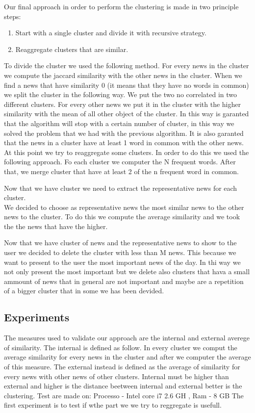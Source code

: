 \documentclass{acm_proc_article-sp}
\begin{document}
Our final approach in order to perform the clustering is made in two principle steps:
\begin{enumerate}
\item Start with a single cluster and divide it with recursive strategy.
\item Reaggregate clusters that are similar.
\end{enumerate}
To divide the cluster we used the following method. For every news in the cluster we compute the jaccard similarity with the other news in the cluster. When we find a news that have similarity 0 (it means that they have no words in common) we split the cluster in the following way. We put the two no correlated in two different clusters. For every other news we put it in the cluster with the higher similarity with the mean of all other object of the cluster. In this way is garanted that the algorithm will stop with a certain number of cluster, in this way we solved the problem that we had with the previous algorithm. It is also garanted that the news in a cluster have at least 1 word in common with the other news.\\
At this point we try to reaggregate some clusters. In order to do this we used the following approach. Fo each cluster we computer the N frequent words. After that, we merge cluster that have at least 2 of the n frequent word in common.

Now that we have cluster we need to extract the representative news for each cluster.\\
We decided to choose as representative news the most similar news to the other news to the cluster. To do this we compute the average similarity and we took the the news that have the higher.

Now that we have cluster of news and the representative news to show to the user we decided to delete the cluster with less than M news. This because we want to present to the user the most important news of the day. In thi way we not only present the most important but we delete also clusters that hava a small ammount of news that in general are not important and maybe are a repetition of a bigger cluster that in some we has been devided.

\subsection{Experiments}
The measures used to validate our approach are the internal and external averege of similarity. The internal is defined as follow. In every cluster we comput the average similarity for every news in the cluster and after we computer the average of this measure. The external instead is defined as the average of similarity for every news with other news of other clusters. Internal must be higher than external and  higher is the distance beetween internal and external better is the clustering.
Test are made on: Processo - Intel core i7 2.6 GH , Ram - 8 GB
The first experiment is to test if wthe part we we try to reggregate is usefull.
\end{document}
